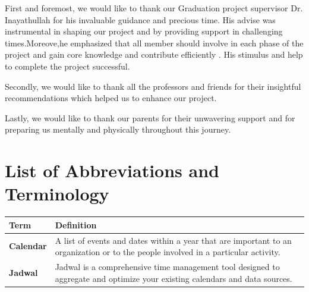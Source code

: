 \documentclass[12pt,a4paper]{report}
\begin{document}
\begin{singlespace}
    \begin{justify}
        First and foremost, we would like to thank our Graduation project supervisor Dr. Inayathullah for his invaluable guidance and precious time. His advise was instrumental in shaping our project and by providing support in challenging times.Moreove,he emphasized that all member should involve in each phase of the project and gain core knowledge and contribute efficiently .
        His stimulus and help to complete the project successful.



        Secondly, we would like to thank all the professors and friends for their insightful recommendations which helped us to enhance our project.



        Lastly, we would like to thank our parents for their unwavering support and for preparing us mentally and physically throughout this journey.
    \end{justify}

    \newpage

    \tableofcontents

    \newpage
    \listoffigures


    \newpage
    \listoftables

    \chapter*{List of Abbreviations and Terminology}

    \begin{center}
        \begin{longtable}{p{}p{}}
            \toprule
            \textbf{Term}             & \textbf{Definition}                                                                                                                                        \\
            \midrule
            \endhead

            \textbf{Calendar}         & A list of events and dates within a year that are important to an organization or to the people involved in a particular activity. \cite{def:calendar}     \\[1ex]

            \textbf{Jadwal}           & Jadwal is a comprehensive time management tool designed to aggregate and optimize your existing calendars and data sources.                                \\[1ex]


\end{longtable}
\end{center}
\end{singlespace}
\end{document}
